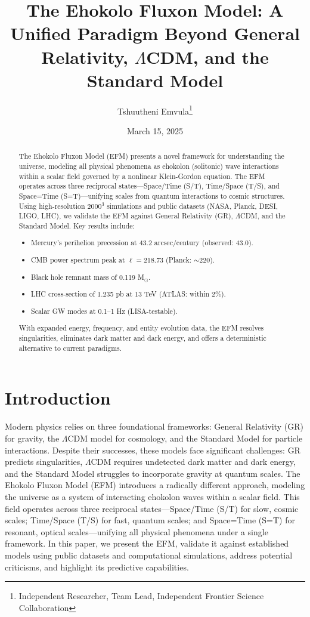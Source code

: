 \documentclass[11pt]{article}
\title{The Ehokolo Fluxon Model: A Unified Paradigm Beyond General Relativity, \(\Lambda\)CDM, and the Standard Model}
\author{Tshuutheni Emvula\thanks{Independent Researcher, Team Lead, Independent Frontier Science Collaboration}}
\date{March 15, 2025}
\begin{document}
\maketitle

\begin{abstract}
The Ehokolo Fluxon Model (EFM) presents a novel framework for understanding the universe, modeling all physical phenomena as ehokolon (solitonic) wave interactions within a scalar field governed by a nonlinear Klein-Gordon equation. The EFM operates across three reciprocal states---Space/Time (S/T), Time/Space (T/S), and Space=Time (S=T)---unifying scales from quantum interactions to cosmic structures. Using high-resolution \(2000^3\) simulations and public datasets (NASA, Planck, DESI, LIGO, LHC), we validate the EFM against General Relativity (GR), \(\Lambda\)CDM, and the Standard Model. Key results include:
\begin{itemize}
    \item Mercury’s perihelion precession at 43.2 arcsec/century (observed: 43.0).
    \item CMB power spectrum peak at \(\ell = 218.73\) (Planck: $\sim$220).
    \item Black hole remnant mass of 0.119 M$_\odot$.
    \item LHC cross-section of 1.235 pb at 13 TeV (ATLAS: within 2\%).
    \item Scalar GW modes at 0.1--1 Hz (LISA-testable).
\end{itemize}
With expanded energy, frequency, and entity evolution data, the EFM resolves singularities, eliminates dark matter and dark energy, and offers a deterministic alternative to current paradigms.
\end{abstract}

\section{Introduction}
Modern physics relies on three foundational frameworks: General Relativity (GR) for gravity, the \(\Lambda\)CDM model for cosmology, and the Standard Model for particle interactions. Despite their successes, these models face significant challenges: GR predicts singularities, \(\Lambda\)CDM requires undetected dark matter and dark energy, and the Standard Model struggles to incorporate gravity at quantum scales. The Ehokolo Fluxon Model (EFM) introduces a radically different approach, modeling the universe as a system of interacting ehokolon waves within a scalar field. This field operates across three reciprocal states---Space/Time (S/T) for slow, cosmic scales; Time/Space (T/S) for fast, quantum scales; and Space=Time (S=T) for resonant, optical scales---unifying all physical phenomena under a single framework. In this paper, we present the EFM, validate it against established models using public datasets and computational simulations, address potential criticisms, and highlight its predictive capabilities.
\end{document}
